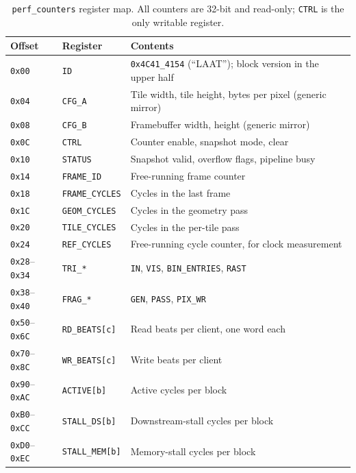 \documentclass[11pt,a4paper]{article}
\begin{document}
\begin{table}[ht]
\centering
\small
\begin{tabular}{@{}lll@{}}
\toprule
\textbf{Offset} & \textbf{Register} & \textbf{Contents} \\
\midrule
\texttt{0x00} & \texttt{ID}          & \texttt{0x4C41\_4154} (``LAAT''); block version in the upper half \\
\texttt{0x04} & \texttt{CFG\_A}      & Tile width, tile height, bytes per pixel (generic mirror) \\
\texttt{0x08} & \texttt{CFG\_B}      & Framebuffer width, height (generic mirror) \\
\texttt{0x0C} & \texttt{CTRL}        & Counter enable, snapshot mode, clear \\
\texttt{0x10} & \texttt{STATUS}      & Snapshot valid, overflow flags, pipeline busy \\
\texttt{0x14} & \texttt{FRAME\_ID}   & Free-running frame counter \\
\texttt{0x18} & \texttt{FRAME\_CYCLES}  & Cycles in the last frame \\
\texttt{0x1C} & \texttt{GEOM\_CYCLES}   & Cycles in the geometry pass \\
\texttt{0x20} & \texttt{TILE\_CYCLES}   & Cycles in the per-tile pass \\
\texttt{0x24} & \texttt{REF\_CYCLES}    & Free-running cycle counter, for clock measurement \\
\texttt{0x28}--\texttt{0x34} & \texttt{TRI\_*}   & \texttt{IN}, \texttt{VIS}, \texttt{BIN\_ENTRIES}, \texttt{RAST} \\
\texttt{0x38}--\texttt{0x40} & \texttt{FRAG\_*}  & \texttt{GEN}, \texttt{PASS}, \texttt{PIX\_WR} \\
\texttt{0x50}--\texttt{0x6C} & \texttt{RD\_BEATS[c]}  & Read beats per client, one word each \\
\texttt{0x70}--\texttt{0x8C} & \texttt{WR\_BEATS[c]}  & Write beats per client \\
\texttt{0x90}--\texttt{0xAC} & \texttt{ACTIVE[b]}     & Active cycles per block \\
\texttt{0xB0}--\texttt{0xCC} & \texttt{STALL\_DS[b]}  & Downstream-stall cycles per block \\
\texttt{0xD0}--\texttt{0xEC} & \texttt{STALL\_MEM[b]} & Memory-stall cycles per block \\
\bottomrule
\end{tabular}
\caption{\texttt{perf\_counters} register map. All counters are 32-bit and
read-only; \texttt{CTRL} is the only writable register.}
\label{tab:perf-regmap}
\end{table}
\end{document}
